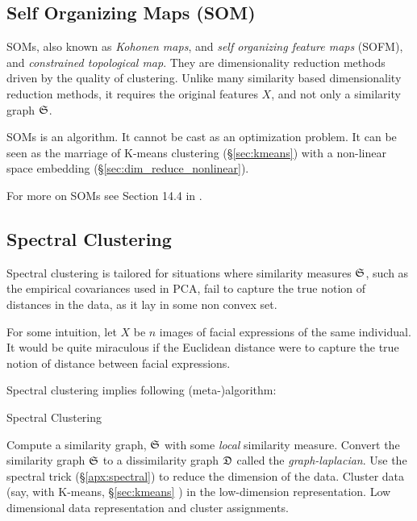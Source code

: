 \subsection{Self Organizing Maps (SOM)}
\label{sec:som}



SOMs, also known as \emph{Kohonen maps}, and \emph{self organizing feature maps} (SOFM), and \emph{constrained topological map}. 
They are dimensionality reduction methods driven by the quality of clustering.
Unlike many similarity based dimensionality reduction methods, it requires the original features $X$, and not only a similarity graph $\mathfrak{S}$. 

SOMs is an algorithm. It cannot be cast as an optimization problem. 
It can be seen as the marriage of K-means clustering (\S\ref{sec:kmeans}) with a non-linear space embedding (\S\ref{sec:dim_reduce_nonlinear}).



For more on SOMs see Section 14.4 in \cite{hastie_elements_2003}. 




\subsection{Spectral Clustering}
\label{sec:spectral_clustering}



Spectral clustering is tailored for situations where \naive similarity measures $\mathfrak{S}$, such as the empirical covariances used in PCA, fail to capture the true notion of distances in the data, as it lay in some non convex set. 

For some intuition, let $X$ be $n$ images of facial expressions of the same individual. It would be quite miraculous if the Euclidean distance were to capture the true notion of distance between facial expressions. 

Spectral clustering implies following (meta-)algorithm:
\begin{algorithm}[H]
\caption{Spectral Clustering}
\begin{algorithmic}
\State Compute a similarity graph, $\mathfrak{S}$ with some \emph{local} similarity measure.
\State Convert the similarity graph $\mathfrak{S}$ to a dissimilarity graph $\mathfrak{D}$ called the \emph{graph-laplacian}.
\State Use the spectral trick (\S\ref{apx:spectral}) to reduce the dimension of the data.
\State Cluster data (say, with K-means, \S\ref{sec:kmeans} ) in the low-dimension representation. 
\State \Return Low dimensional data representation and cluster assignments. 
\end{algorithmic}
\end{algorithm}



